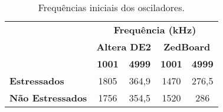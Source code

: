 \begin{table}[H]
\centering
\caption{Frequências iniciais dos osciladores.}
\begin{tabular}{l|cccc|}
\cline{2-5}
 & \multicolumn{4}{c|}{\textbf{Frequência (kHz)}} \\ \cline{2-5} 
 & \multicolumn{2}{c|}{\textbf{Altera DE2}} & \multicolumn{2}{c|}{\textbf{ZedBoard}} \\ \cline{2-5} 
 & \multicolumn{1}{c|}{\textbf{1001}} & \multicolumn{1}{c|}{\textbf{4999}} & \multicolumn{1}{c|}{\textbf{1001}} & \textbf{4999} \\ \hline
\multicolumn{1}{|l|}{\textbf{Estressados}} & \multicolumn{1}{c|}{1805} & \multicolumn{1}{c|}{364,9} & \multicolumn{1}{c|}{1470} & 276,5 \\ \hline
\multicolumn{1}{|l|}{\textbf{Não Estressados}} & \multicolumn{1}{c|}{1756} & \multicolumn{1}{c|}{354,5} & \multicolumn{1}{c|}{1520} & 286 \\ \hline
\end{tabular}
\label{tab:FreqIniciais}
\end{table}
